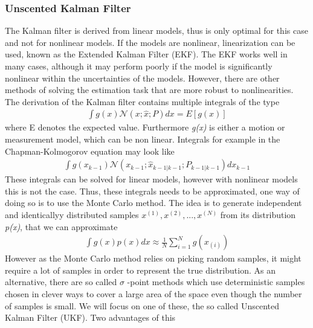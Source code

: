 \begin{itemize}
                    \subsubsection{Unscented Kalman Filter}
                        The Kalman filter is derived from linear models, thus is only optimal for this case and not for nonlinear models. If the models are nonlinear, linearization can be used, known as the Extended Kalman Filter (EKF). 
                        The EKF works well in many cases, although it may perform poorly if the model is significantly nonlinear within the uncertainties of the models. However, there are other methods of solving the estimation task that 
                        are more robust to nonlinearities. The derivation of the Kalman filter contains multiple integrals of the type
                        \begin{align}
                            \int g(x) \mathcal{N} (x;\hat{x};P) dx = E [g(x)]
                        \end{align}
                        where E denotes the expected value. Furthermore \emph{g(x)} is either a motion or measurement model, which can be non linear. Integrals for example in the Chapman-Kolmogorov equation may look like 
                        \begin{align}
                            \int g(x_{k-1}) \mathcal{N} (x_{k-1}; \hat{x}_{k-1|k-1}; P_{k-1|k-1}) dx_{k-1}
                        \end{align}
                        These integrals can be solved for linear models, however with nonlinear models this is not the case. Thus, these integrals needs to be approximated, one way of doing so is to use the Monte Carlo method. 
                        The idea is to generate independent and identicallyy distributed samples $x^{(1)},x^{(2)},...,x^{(N)}$ from its distribution \emph{p(x)}, that we can approximate
                        \begin{align}
                            \int g(x) p(x) dx \approx \frac{1}{N} \displaystyle\sum_{i=1}^N g(x_{(i)})
                        \end{align}
                        However as the Monte Carlo method relies on picking random samples, it might require a lot of samples in order to represent the true distribution. As an alternative, there are so called $\sigma$ -point methods which use 
                        deterministic samples chosen in clever ways to cover a large area of the space even though the number of samples is small. We will focus on one of these, the so called Unscented Kalman Filter (UKF). Two advantages of this 

\end{itemize}
